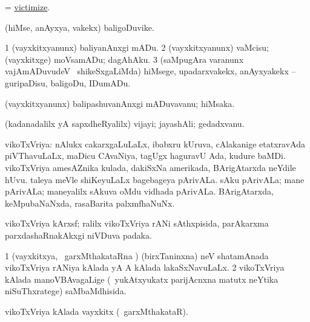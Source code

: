 \bentry
{} 
\gl{\sakirx}
\expl{}
\bmng
 = \hyperlink{victimize}{victimize}. 
\emng
\eentry

\bentry
{} 
\gl{\nA}
\expl{}
\bmng
 (hiMse, anAyxya, \mo vakekx) baligoDuvike. 
\emng
\eentry

\bentry
{} 
\gl{\sakirx}
\expl{}
\bmng
\bnum
\num{1} (vayxkitxyanunx) baliyanAnxgi mADu. 
\num{2} (vayxkitxyanunx) vaMcisu; (vayxkitxge) moVsamADu; dagAhAku. 
\num{3} (saMpugAra \mo varanunx vajAmADuvudeV \mo\ shikeSxgaLiMda) hiMsege, upadarxvakekx, anAyxyakekx -- guripaDisu, baligoDu, IDumADu. 
\enum
\emng
\eentry

\bentry
{} 
\gl{\nA}
\expl{}
\bmng
 (vayxkitxyanunx) balipashuvanAnxgi mADuvavanu; hiMsaka. 
\emng
\eentry

\bentry
{} 
\gl{\nA}
\expl{}
\bmng
 (kadanadalilx yA sapxdheRyalilx) vijayi; jayashAli; gedadxvanu. 
\emng
\eentry

\bentry
{} 
\gl{\nA}
\expl{}
\bmng
 vikoTxVriya: 
\banum
{} nAlukx cakarxgaLuLaLx, ibabxru kUruva, cAlakanige etatxravAda piVThavuLaLx, maDicu CAvaNiya, tagUgx haguravU Ada, kudure baMDi.  
 vikoTxVriya amesAZnika kulada, dakiSxNa amerikada, BArigAtarxda neYdile hUvu. 
 taleya meVle shiKeyuLaLx bagebageya pArivALa. 
 sAku pArivALa; mane pArivALa; maneyalilx sAkuva oMdu vidhada pArivALa. 
\hypertarget{victoria(e)}{} 
 BArigAtarxda, keMpubaNaNxda, rasaBarita palxmfhaNuNx. 
\eanum
\emng
\eentry

\bentry
{}
\gl{\nA}
\expl{}
\bmng
 vikoTxVriya kArxsf; ralilx vikoTxVriya rANi sAthxpisida, parAkarxma parxdashaRnakAkxgi niVDuva padaka. 
\emng
\eentry

\bentry
{} 
\gl{\gu}
\expl{}
\bmng
\bnum
\num{1} (vayxkitxya, \kanmu\ garxMthakataRna \vi) (birxTaninxna) neV shatamAnada vikoTxVriya rANiya kAlada yA A kAlada lakaSxNavuLaLx. 
\num{2} vikoTxVriya kAlada manoVBAvagaLige (\kanmu\ yukAtxyukatx parijAcnxna matutx neYtika niSuThxratege) saMbaMdhisida. 
\enum
\emng
\eentry

\bentry
{} 
\gl{\nA}
\expl{}
\bmng
 vikoTxVriya kAlada vayxkitx (\kanmu\ garxMthakataR). 
\emng
\eentry

